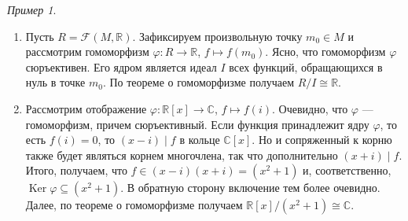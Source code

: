 \documentclass[a4paper,10pt]{amsart}
\newcommand{\Ker}{\mathop{\mathrm{Ker}}}
\def\CC{{\mathbb C}}%
\def\RR{{\mathbb R}}%
\def\FFF{\mathcal{F}}
\theoremstyle{definition}
\theoremstyle{remark}
\newtheorem{example}{Пример}
\begin{document}
\begin{example}\ 
\begin{enumerate}
\item Пусть $R = \FFF(M, \RR)$. Зафиксируем произвольную точку $m_0 \in M$
и рассмотрим гомоморфизм $\varphi \colon R \to \RR$, $f \mapsto
f(m_0)$. Ясно, что гомоморфизм $\varphi$ сюръективен. Его ядром
является идеал $I$ всех функций, обращающихся в нуль в точке $m_0$.
По теореме о гомоморфизме получаем $R / I \cong \RR$.
\item Рассмотрим отображение $\varphi \colon \RR[x] \to \CC$, $f \mapsto f(i)$. Очевидно, что $\varphi$ --- гомоморфизм, причем сюръективный. Если функция принадлежит ядру $\varphi$, то есть $f(i) = 0$, то $(x - i) \mid f$ в кольце $\CC[x]$. Но и сопряженный к корню также будет являться корнем многочлена, так что дополнительно $(x + i) \mid f$. Итого, получаем, что $f \in (x - i)(x + i) = (x^2 + 1)$ и, соответственно, $\Ker \varphi  \subseteq (x^2 + 1)$. В обратную сторону включение тем более очевидно. Далее, по теореме о гомоморфизме получаем $\RR[x] / (x^2 + 1) \cong \CC$.
\end{enumerate}
\end{example}
\end{document}
